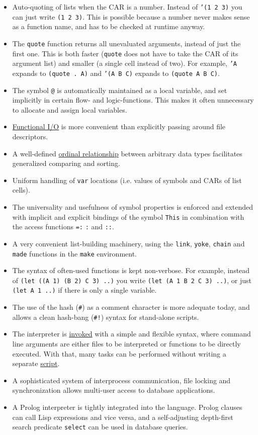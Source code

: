 \begin{itemize}
\item Auto-quoting of lists when the CAR is a number. Instead of \texttt{'(1 2 3)}    you can just write \texttt{(1 2 3)}. This is possible because a number never
   makes sense as a function name, and has to be checked at runtime
   anyway.
\item The \texttt{quote} function returns all unevaluated arguments, instead of
   just the first one. This is both faster (\texttt{quote} does not have to
   take the CAR of its argument list) and smaller (a single cell instead
   of two). For example, \texttt{'A} expands to \texttt{(quote . A)} and \texttt{'(A B C)}    expands to \texttt{(quote A B C)}.
\item The symbol \texttt{@} is automatically maintained as a local variable, and
   set implicitly in certain flow- and logic-functions. This makes it
   often unnecessary to allocate and assign local variables.
\item \hyperref[tut.html-funio]{Functional I/O} is more convenient than explicitly
   passing around file descriptors.
\item A well-defined \hyperref[ref.html-cmp]{ordinal relationship} between
   arbitrary data types facilitates generalized comparing and sorting.
\item Uniform handling of \texttt{var} locations (i.e. values of symbols and CARs
   of list cells).
\item The universality and usefulness of symbol properties is enforced and
   extended with implicit and explicit bindings of the symbol \texttt{This} in
   combination with the access functions \texttt{=:}  \texttt{:} and \texttt{::}.
\item A very convenient list-building machinery, using the \texttt{link}, \texttt{yoke},
   \texttt{chain} and \texttt{made} functions in the \texttt{make} environment.
\item The syntax of often-used functions is kept non-verbose. For example,
   instead of \texttt{(let ((A 1) (B 2) C 3) ..)} you write
   \texttt{(let (A 1 B 2 C 3) ..)}, or just \texttt{(let A 1 ..)} if there is only a
   single variable.
\item The use of the hash (\texttt{\#}) as a comment character is more adequate
   today, and allows a clean hash-bang (\texttt{\#!}) syntax for stand-alone
   scripts.
\item The interpreter is \hyperref[ref.html-invoc]{invoked} with a simple and
   flexible syntax, where command line arguments are either files to be
   interpreted or functions to be directly executed. With that, many
   tasks can be performed without writing a separate
   \hyperref[tut.html-script]{script}.
\item A sophisticated system of interprocess communication, file locking
   and synchronization allows multi-user access to database
   applications.
\item A Prolog interpreter is tightly integrated into the language. Prolog
   clauses can call Lisp expressions and vice versa, and a
   self-adjusting depth-first search predicate \texttt{select} can be used in
   database queries.
\end{itemize}

